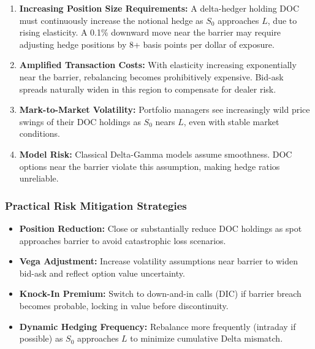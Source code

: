 \documentclass{report}
\begin{document}
\begin{enumerate}
    \item \textbf{Increasing Position Size Requirements:} A delta-hedger holding DOC must continuously increase the notional hedge as $S_0$ approaches $L$, due to rising elasticity. A 0.1\% downward move near the barrier may require adjusting hedge positions by 8+ basis points per dollar of exposure.
    
    \item \textbf{Amplified Transaction Costs:} With elasticity increasing exponentially near the barrier, rebalancing becomes prohibitively expensive. Bid-ask spreads naturally widen in this region to compensate for dealer risk.
    
    \item \textbf{Mark-to-Market Volatility:} Portfolio managers see increasingly wild price swings of their DOC holdings as $S_0$ nears $L$, even with stable market conditions.
    
    \item \textbf{Model Risk:} Classical Delta-Gamma models assume smoothness. DOC options near the barrier violate this assumption, making hedge ratios unreliable.
\end{enumerate}

\subsubsection{Practical Risk Mitigation Strategies}

\begin{itemize}
    \item \textbf{Position Reduction:} Close or substantially reduce DOC holdings as spot approaches barrier to avoid catastrophic loss scenarios.
    
    \item \textbf{Vega Adjustment:} Increase volatility assumptions near barrier to widen bid-ask and reflect option value uncertainty.
    
    \item \textbf{Knock-In Premium:} Switch to down-and-in calls (DIC) if barrier breach becomes probable, locking in value before discontinuity.
    
    \item \textbf{Dynamic Hedging Frequency:} Rebalance more frequently (intraday if possible) as $S_0$ approaches $L$ to minimize cumulative Delta mismatch.
\end{itemize}
\end{document}
